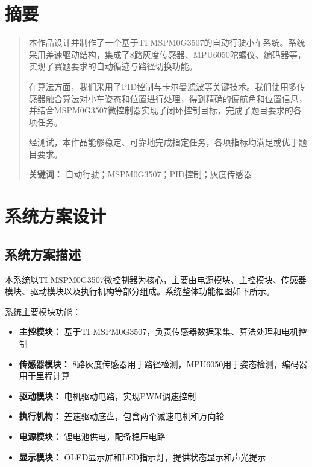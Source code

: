 \documentclass[UTF8]{ctexart}
\begin{document}
\section*{摘要}
\begin{quote}
    \noindent
    本作品设计并制作了一个基于TI MSPM0G3507的自动行驶小车系统。系统采用差速驱动结构，集成了8路灰度传感器、MPU6050陀螺仪、编码器等，实现了赛题要求的自动循迹与路径切换功能。
    
    在算法方面，我们采用了PID控制与卡尔曼滤波等关键技术。我们使用多传感器融合算法对小车姿态和位置进行处理，得到精确的偏航角和位置信息，并结合MSPM0G3507微控制器实现了闭环控制目标，完成了题目要求的各项任务。
    
    经测试，本作品能够稳定、可靠地完成指定任务，各项指标均满足或优于题目要求。

    \vspace{1cm}
    \noindent
    \textbf{关键词：} 自动行驶；MSPM0G3507；PID控制；灰度传感器
\end{quote}

\newpage
\tableofcontents
\newpage

\section{系统方案设计}

\subsection{系统方案描述}
    
本系统以TI MSPM0G3507微控制器为核心，主要由电源模块、主控模块、传感器模块、驱动模块以及执行机构等部分组成。系统整体功能框图如下所示。

系统主要模块功能：

\begin{itemize}
    \item \textbf{主控模块：} 基于TI MSPM0G3507，负责传感器数据采集、算法处理和电机控制
    \item \textbf{传感器模块：} 8路灰度传感器用于路径检测，MPU6050用于姿态检测，编码器用于里程计算
    \item \textbf{驱动模块：} 电机驱动电路，实现PWM调速控制
    \item \textbf{执行机构：} 差速驱动底盘，包含两个减速电机和万向轮
    \item \textbf{电源模块：} 锂电池供电，配备稳压电路
    \item \textbf{显示模块：} OLED显示屏和LED指示灯，提供状态显示和声光提示
\end{itemize}
\end{document}
